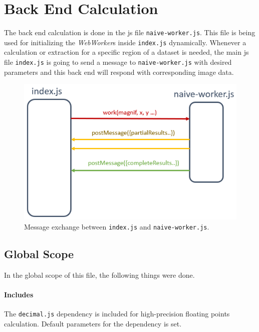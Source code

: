 
\section{Back End Calculation}

The back end calculation is done in the \gls{js} file \texttt{naive-worker.js}. This file is being used for initializing the \emph{WebWorker}s inside \texttt{index.js} dynamically. Whenever a calculation or extraction for a specific region of a dataset is needed, the main \gls{js} file \texttt{index.js} is going to send a message to \texttt{naive-worker.js} with desired parameters and this back end will respond with corresponding image data.

\begin{figure}[th]
\centering
\includegraphics{Figures/Chapter4/messageexchange.png}
\decoRule
\caption[Message Exchange]{Message exchange between \texttt{index.js} and \texttt{naive-worker.js}.}
\label{fig:messageexchange}
\end{figure}

\subsection{Global Scope}

In the global scope of this file, the following things were done.

\paragraph{Includes} The \texttt{decimal.js} dependency is included for high-precision floating points calculation. Default parameters for the dependency is set.


